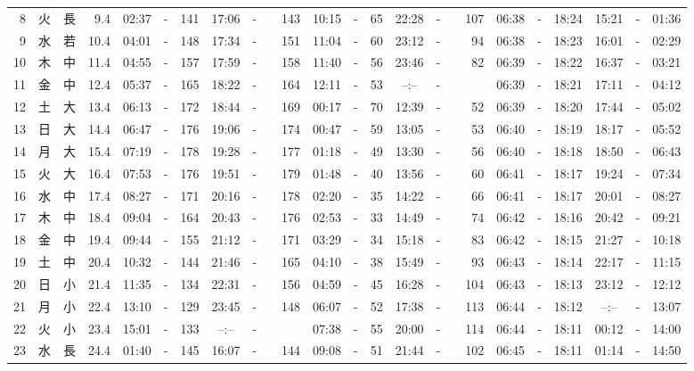 \documentclass[12pt,a4j]{jsarticle}
\begin{document}
\begin{table}[htbp]
\begin{center}
{\begin{tabular}{|rc|cr|ccrccr|ccrccr|ccc|ccc|}
 8 & 火 & 長 &  9.4 &  02:37 &-& 141 &  17:06 &-& 143 &  10:15 &-&  65 &  22:28 &-& 107 & 06:38 & -& 18:24 & 15:21 & -& 01:36 \\
 9 & 水 & 若 & 10.4 &  04:01 &-& 148 &  17:34 &-& 151 &  11:04 &-&  60 &  23:12 &-&  94 & 06:38 & -& 18:23 & 16:01 & -& 02:29 \\
10 & 木 & 中 & 11.4 &  04:55 &-& 157 &  17:59 &-& 158 &  11:40 &-&  56 &  23:46 &-&  82 & 06:39 & -& 18:22 & 16:37 & -& 03:21 \\
11 & 金 & 中 & 12.4 &  05:37 &-& 165 &  18:22 &-& 164 &  12:11 &-&  53 &  --:-- &-&~~~~~ & 06:39 & -& 18:21 & 17:11 & -& 04:12 \\
12 & 土 & 大 & 13.4 &  06:13 &-& 172 &  18:44 &-& 169 &  00:17 &-&  70 &  12:39 &-&  52 & 06:39 & -& 18:20 & 17:44 & -& 05:02 \\
13 & 日 & 大 & 14.4 &  06:47 &-& 176 &  19:06 &-& 174 &  00:47 &-&  59 &  13:05 &-&  53 & 06:40 & -& 18:19 & 18:17 & -& 05:52 \\
14 & 月 & 大 & 15.4 &  07:19 &-& 178 &  19:28 &-& 177 &  01:18 &-&  49 &  13:30 &-&  56 & 06:40 & -& 18:18 & 18:50 & -& 06:43 \\
15 & 火 & 大 & 16.4 &  07:53 &-& 176 &  19:51 &-& 179 &  01:48 &-&  40 &  13:56 &-&  60 & 06:41 & -& 18:17 & 19:24 & -& 07:34 \\
16 & 水 & 中 & 17.4 &  08:27 &-& 171 &  20:16 &-& 178 &  02:20 &-&  35 &  14:22 &-&  66 & 06:41 & -& 18:17 & 20:01 & -& 08:27 \\
17 & 木 & 中 & 18.4 &  09:04 &-& 164 &  20:43 &-& 176 &  02:53 &-&  33 &  14:49 &-&  74 & 06:42 & -& 18:16 & 20:42 & -& 09:21 \\
18 & 金 & 中 & 19.4 &  09:44 &-& 155 &  21:12 &-& 171 &  03:29 &-&  34 &  15:18 &-&  83 & 06:42 & -& 18:15 & 21:27 & -& 10:18 \\
19 & 土 & 中 & 20.4 &  10:32 &-& 144 &  21:46 &-& 165 &  04:10 &-&  38 &  15:49 &-&  93 & 06:43 & -& 18:14 & 22:17 & -& 11:15 \\
20 & 日 & 小 & 21.4 &  11:35 &-& 134 &  22:31 &-& 156 &  04:59 &-&  45 &  16:28 &-& 104 & 06:43 & -& 18:13 & 23:12 & -& 12:12 \\
21 & 月 & 小 & 22.4 &  13:10 &-& 129 &  23:45 &-& 148 &  06:07 &-&  52 &  17:38 &-& 113 & 06:44 & -& 18:12 & --:-- & -& 13:07 \\
22 & 火 & 小 & 23.4 &  15:01 &-& 133 &  --:-- &-&~~~~~ &  07:38 &-&  55 &  20:00 &-& 114 & 06:44 & -& 18:11 & 00:12 & -& 14:00 \\
23 & 水 & 長 & 24.4 &  01:40 &-& 145 &  16:07 &-& 144 &  09:08 &-&  51 &  21:44 &-& 102 & 06:45 & -& 18:11 & 01:14 & -& 14:50 \\

\end{tabular}}
\end{center}
\end{table}
\end{document}
